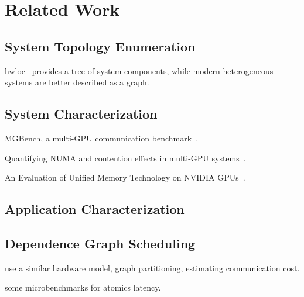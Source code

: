 \chapter{Related Work}
\label{ch:related}

\section{System Topology Enumeration}

hwloc~\cite{broquedis2010hwloc} provides a tree of system components, while modern heterogeneous systems are better described as a graph.


\section{System Characterization}

MGBench, a multi-GPU communication benchmark~\cite{bennun2016mgbench}.

Quantifying NUMA and contention effects in multi-GPU systems~\cite{spafford2011quantifying}.

An Evaluation of Unified Memory Technology on NVIDIA GPUs~\cite{li2015evaluation}.

\section{Application Characterization}


\section{Dependence Graph Scheduling}

\cite{amaral2017topology} use a similar hardware model, graph partitioning, estimating communication cost.

\cite{gomez2013performance} some microbenchmarks for atomics latency.